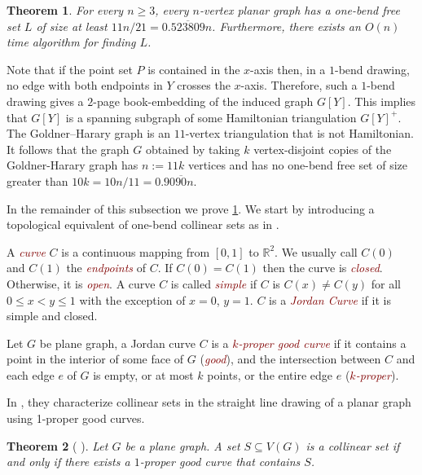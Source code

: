 \documentclass[a4paper,UKenglish, cleveref, autoref, thm-restate]{lipics-v2021}
\newtheorem{thm}{Theorem}
\newcommand{\defin}[1]{\emph{\textcolor{Maroon}{#1}}}
\begin{document}
\begin{thm}\label{one_bend_collinear_thm}
  For every $n\ge 3$, every $n$-vertex planar graph has a one-bend free set $L$ of size at least $11n/21=0.\overline{523809}n$.  Furthermore, there exists an $O(n)$ time algorithm for finding $L$.
\end{thm}

Note that if the point set $P$ is contained in the $x$-axis then, in a $1$-bend drawing, no edge with both endpoints in $Y$ crosses the $x$-axis.  Therefore, such a $1$-bend drawing gives a $2$-page book-embedding of the induced graph $G[Y]$. This implies that $G[Y]$ is a spanning subgraph of some Hamiltonian triangulation $G[Y]^+$.  The Goldner–Harary graph is an $11$-vertex triangulation that is not Hamiltonian. It follows that the graph $G$ obtained by taking $k$ vertex-disjoint copies of the Goldner-Harary graph has $n:=11k$ vertices and has no one-bend free set of size greater than $10k=10n/11=0.90\overline{90}n$.

In the remainder of this subsection we prove \cref{one_bend_collinear_thm}. We start by introducing a topological equivalent of one-bend collinear sets as in \cite{DBLP:journals/jocg/LozzoDFMR18}.

A \defin{curve} $C$ is a continuous mapping from $[0, 1]$ to $\mathbb{R}^2$. We usually call $C(0)$ and $C(1)$ the \defin{endpoints} of $C$. If $C(0)=C(1)$ then  the curve is \defin{closed}. Otherwise, it is \defin{open}. A curve $C$ is called \defin{simple} if $C$ is $C(x) \neq C(y)$ for all $0\le x<y\le 1$ with the exception of $x=0$, $y=1$. $C$ is a \defin{Jordan Curve} if it is simple and closed.

Let $G$ be plane graph, a Jordan curve $C$ is a \defin{$k$-proper good curve} if it contains a point in the interior of some face of $G$ (\defin{good}), and the intersection between $C$ and each edge $e$ of $G$ is empty, or at most $k$ points, or the entire edge $e$ (\defin{$k$-proper}).

In \cite{DBLP:journals/jocg/LozzoDFMR18}, they characterize collinear sets in the straight line drawing of a planar graph using 1-proper good curves.

\begin{thm}[\cite{DBLP:journals/jocg/LozzoDFMR18} ] \label{straightline-topological}
Let $G$ be a plane graph. A set $S \subseteq V(G)$ is a collinear set if and only if there exists a $1$-proper good curve that contains $S$.
\end{thm}
\end{document}
